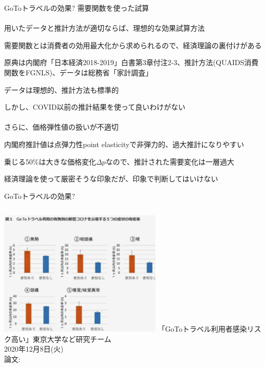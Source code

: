 \begin{frame}[t]{GoToトラベルの効果?}
需要関数を使った試算\\~\\
\pause
用いたデータと推計方法が適切ならば、理想的な効果試算方法
\begin{dinglist}{43}\footnotesize
\vspace{1.0ex}\setlength{\itemsep}{1.0ex}\setlength{\baselineskip}{12pt}
\pause
\item	需要関数とは消費者の効用最大化から求められるので、経済理論の裏付けがある
\pause
\item	原典は内閣府「日本経済2018-2019」白書第3章付注2-3、推計方法(QUAIDS消費関数をFGNLS)、データは総務省「家計調査」
\pause
\item	データは理想的、推計方法も標準的
\end{dinglist}

\pause
\vspace{2ex}
しかし、COVID以前の推計結果を使って良いわけがない\\~\\
\pause
さらに、価格弾性値の扱いが不適切
\begin{dinglist}{43}\footnotesize
\vspace{1.0ex}\setlength{\itemsep}{1.0ex}\setlength{\baselineskip}{12pt}
\pause
\item	内閣府推計値は点弾力性point elasticityで非弾力的、過大推計になりやすい
\pause
\item	乗じる50\%は大きな価格変化$\Delta p$なので、推計された需要変化は一層過大
\end{dinglist}
\pause
\vspace{2ex}
経済理論を使って厳密そうな印象だが、印象で判断してはいけない
\end{frame}

\begin{frame}[t]{GoToトラベルの効果?}
\begin{columns}[T]
\column{.475\paperwidth}
\includegraphics[clip, height = 6cm]{ImpactEvaluation/figure/TokyoShinbun_GoToCovid.jpg}
\column{.475\paperwidth}
「GoToトラベル利用者感染リスク高い」東京大学など研究チーム\\
2020年12月8日(火)\\
論文: \citet{Miyawaki2020}
\end{columns}
\end{frame}

